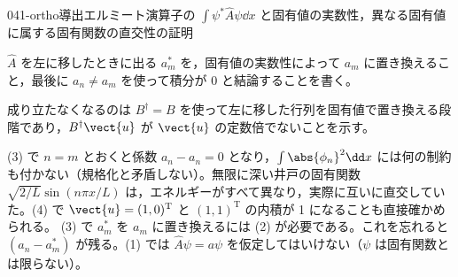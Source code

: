 \documentclass[uplatex,dvipdfmx,a4paper,11pt]{jsarticle}
\begin{document}
\begin{mondai}{041-ortho}{導出}{エルミート演算子の $\int\psi^{*}\hat{A}\psi\dd x$ と固有値の実数性，異なる固有値に属する固有関数の直交性の証明}
\begin{tadashii}
\begin{ronten}
  \item {} $\hat{A}$ を左に移したときに出る $a_{m}^{*}$ を，固有値の実数性によって $a_{m}$ に置き換えること，最後に $a_{n}\neq a_{m}$ を使って積分が 0 と結論することを書く。
  \item {} 成り立たなくなるのは $B^{\dagger}=B$ を使って左に移した行列を固有値で置き換える段階であり，$B^{\dagger}\vect{u}$ が $\vect{u}$ の定数倍でないことを示す。
\end{ronten}
\kenzan (3) で $n=m$ とおくと係数 $a_{n}-a_{n}=0$ となり，$\int\abs{\phi_{n}}^{2}\dd x$ には何の制約も付かない（規格化と矛盾しない）。無限に深い井戸の固有関数 $\sqrt{2/L}\sin(n\pi x/L)$ は，エネルギーがすべて異なり，実際に互いに直交していた。(4) で $\vect{u}=(1,0)^{\mathrm{T}}$ と $(1,1)^{\mathrm{T}}$ の内積が 1 になることも直接確かめられる。
\tsumazuki (3) で $a_{m}^{*}$ を $a_{m}$ に置き換えるには (2) が必要である。これを忘れると $(a_{n}-a_{m}^{*})$ が残る。(1) では $\hat{A}\psi=a\psi$ を仮定してはいけない（$\psi$ は固有関数とは限らない）。
\end{tadashii}
\end{mondai}
\end{document}
